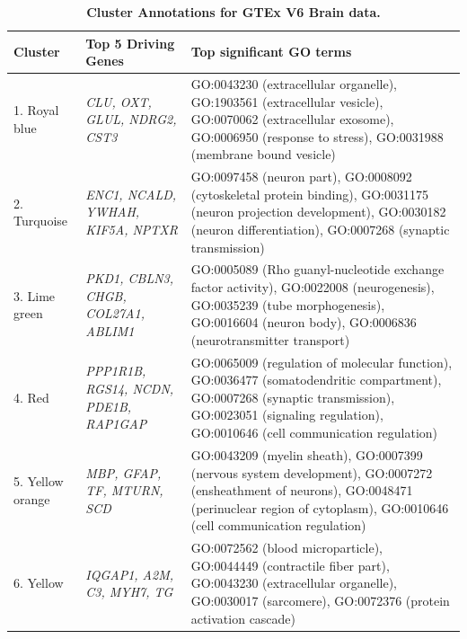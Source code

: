\documentclass[10pt,letterpaper]{article}
\begin{document}
\begin{table}[!hp]
\begin{adjustwidth}{-2in}{0in} %
\footnotesize
\centering
\caption{\bf Cluster Annotations for GTEx V6 Brain data.}
\renewcommand{\arraystretch}{1.7}
\begin{tabular}{|p{1.0in}|p{1.5in}|p{4.3in}|}
 \hline
 Cluster & Top 5 Driving \qquad Genes  &  Top significant GO terms \\
\hline
 1. Royal blue &  \textit{CLU, OXT,  GLUL, NDRG2, CST3} & GO:0043230 (extracellular organelle), GO:1903561 (extracellular vesicle), GO:0070062 (extracellular exosome), GO:0006950 (response to stress), GO:0031988 (membrane bound vesicle) \\
 \hline
2. Turquoise & \textit{ENC1, NCALD, YWHAH, KIF5A, NPTXR} & GO:0097458 (neuron part), GO:0008092 (cytoskeletal protein binding), GO:0031175 (neuron projection development), GO:0030182 (neuron differentiation), GO:0007268 (synaptic transmission) \\
\hline
 3. Lime green & \textit{PKD1, CBLN3, CHGB, COL27A1, ABLIM1} & GO:0005089 (Rho guanyl-nucleotide exchange factor activity), GO:0022008 (neurogenesis), GO:0035239 (tube morphogenesis), GO:0016604 (neuron body), GO:0006836 (neurotransmitter transport) \\
\hline
4. Red & \textit{PPP1R1B, RGS14, NCDN, PDE1B, RAP1GAP} & GO:0065009 (regulation of molecular function), GO:0036477 (somatodendritic compartment), GO:0007268 (synaptic transmission), GO:0023051 (signaling regulation), GO:0010646 (cell communication regulation) \\
\hline
5. Yellow orange & \textit{MBP, GFAP, TF, MTURN, SCD} & GO:0043209 (myelin sheath), GO:0007399 (nervous system development), GO:0007272 (ensheathment of neurons), GO:0048471 (perinuclear region of cytoplasm), GO:0010646 (cell communication regulation)\\
\hline
6. Yellow & \textit{IQGAP1, A2M, C3, MYH7, TG} & GO:0072562 (blood microparticle), GO:0044449 (contractile fiber part), GO:0043230 (extracellular organelle), GO:0030017 (sarcomere), GO:0072376 (protein activation cascade) \\
\hline
\end{tabular} \label{tab2}
\end{adjustwidth}
 \end{table}
\end{document}
